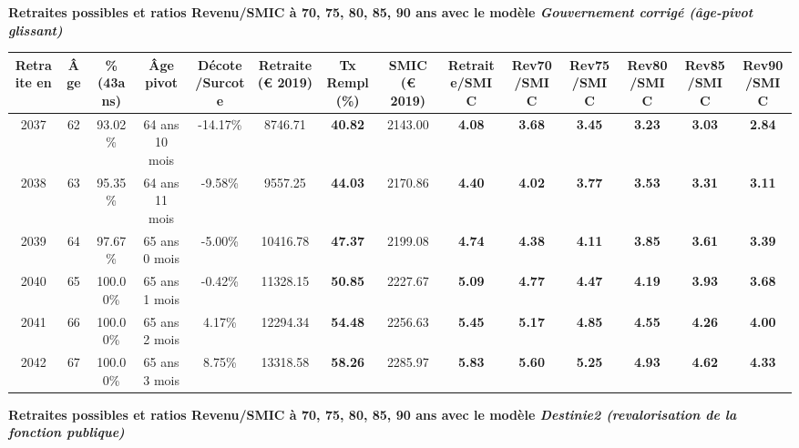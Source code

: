  \vspace{0.1cm} 
{\bf \noindent Retraites possibles et ratios Revenu/SMIC à 70, 75, 80, 85, 90 ans avec le modèle \emph{Gouvernement corrigé (âge-pivot glissant)}}  
 
\begin{adjustbox}{max width=\textwidth} 
\begin{tabular}[htb]{|c|c||c|c|c||c|c||c||c|c|c|c|c|c|} 
\hline 
 Retraite en &  Âge &  \%(43ans) &  Âge pivot &  Décote/Surcote &  Retraite (\euro{} 2019) &  Tx Rempl(\%) &  SMIC (\euro{} 2019) &  Retraite/SMIC &  Rev70/SMIC &  Rev75/SMIC &  Rev80/SMIC &  Rev85/SMIC &  Rev90/SMIC \\ 
\hline \hline 
 2037 &  62 &  93.02\% &  64 ans 10 mois &  -14.17\% &  8746.71 &  {\bf 40.82} &  2143.00 &  {\bf 4.08} &  {\bf 3.68} &  {\bf 3.45} &  {\bf 3.23} &  {\bf 3.03} &  {\bf 2.84} \\ 
\hline 
 2038 &  63 &  95.35\% &  64 ans 11 mois &  -9.58\% &  9557.25 &  {\bf 44.03} &  2170.86 &  {\bf 4.40} &  {\bf 4.02} &  {\bf 3.77} &  {\bf 3.53} &  {\bf 3.31} &  {\bf 3.11} \\ 
\hline 
 2039 &  64 &  97.67\% &  65 ans 0 mois &  -5.00\% &  10416.78 &  {\bf 47.37} &  2199.08 &  {\bf 4.74} &  {\bf 4.38} &  {\bf 4.11} &  {\bf 3.85} &  {\bf 3.61} &  {\bf 3.39} \\ 
\hline 
 2040 &  65 &  100.00\% &  65 ans 1 mois &  -0.42\% &  11328.15 &  {\bf 50.85} &  2227.67 &  {\bf 5.09} &  {\bf 4.77} &  {\bf 4.47} &  {\bf 4.19} &  {\bf 3.93} &  {\bf 3.68} \\ 
\hline 
 2041 &  66 &  100.00\% &  65 ans 2 mois &  4.17\% &  12294.34 &  {\bf 54.48} &  2256.63 &  {\bf 5.45} &  {\bf 5.17} &  {\bf 4.85} &  {\bf 4.55} &  {\bf 4.26} &  {\bf 4.00} \\ 
\hline 
 2042 &  67 &  100.00\% &  65 ans 3 mois &  8.75\% &  13318.58 &  {\bf 58.26} &  2285.97 &  {\bf 5.83} &  {\bf 5.60} &  {\bf 5.25} &  {\bf 4.93} &  {\bf 4.62} &  {\bf 4.33} \\ 
\hline 
\hline 
\end{tabular} 
\end{adjustbox} 
 
 \vspace{0.1cm} 
{\bf \noindent Retraites possibles et ratios Revenu/SMIC à 70, 75, 80, 85, 90 ans avec le modèle \emph{Destinie2 (revalorisation de la fonction publique)}}  
 
